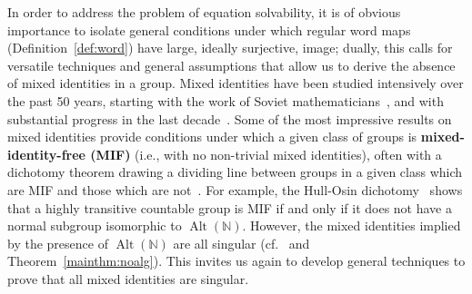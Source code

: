 \documentclass{article}
\theoremstyle{remark}
\theoremstyle{definition}
\newcommand{\remmic}[1]{\textcolor{orange}{MP: #1}}
\DeclareMathOperator{\Alt}{Alt}
\begin{document}

In order to address the problem of equation solvability, it is of obvious  importance to isolate general conditions under which regular word maps (Definition~\ref{def:word}) have large, ideally surjective, image;  dually, 
this calls for versatile techniques and 
 general
assumptions that allow us to derive the absence of mixed identities in a group. %
Mixed identities have been studied intensively over the past 50 years, starting with the work of Soviet mathematicians~\cite{anashin1978mixed, tomanov1985generalized, golubchik1982generalized}, and with substantial progress in the last decade~\cite{hull2016transitivity, bradford2023non, bradford2025length, etedadialiabadi2021dense, ivanov2025mixed}. Some of the most impressive results on mixed identities provide  %
conditions under which a given class of groups is \textbf{mixed-identity-free (MIF)} (i.e., with no non-trivial mixed identities), often with a dichotomy theorem drawing %
a dividing line between groups in a given class which are MIF and those which are not~\cite{tomanov1985generalized, hull2016transitivity, bradford2023non}. For example, the %
Hull-Osin dichotomy~\cite{hull2016transitivity} shows that a highly transitive countable group is MIF if and only if it does not have a normal subgroup isomorphic to $\Alt(\mathbb{N})$. However, the mixed identities implied by the presence of $\Alt(\mathbb{N})$ are all singular (cf.~\cite{bodirsky2024mixed} and Theorem~\ref{mainthm:noalg}). This invites us again to %
develop general techniques to prove that all mixed identities are singular.
\end{document}
